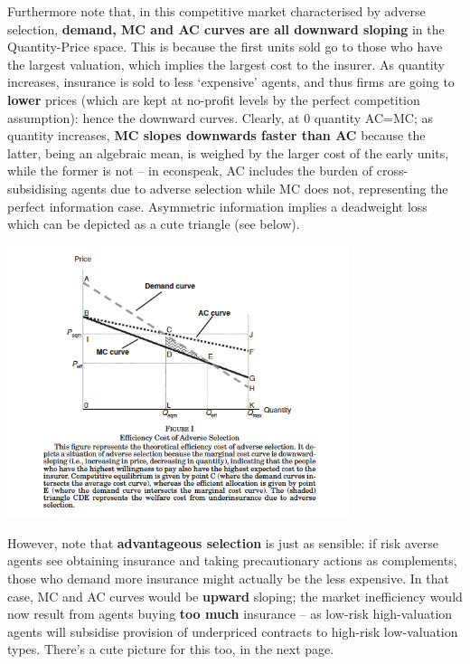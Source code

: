 \documentclass[11pt]{article}
\numberwithin{equation}{section}
\begin{document}
Furthermore note that, in this competitive market characterised by adverse selection, \textbf{demand, MC and AC curves are all downward sloping} in the Quantity-Price space.
This is because the first units sold go to those who have the largest valuation, which implies the largest cost to the insurer.
As quantity increases, insurance is sold to less `expensive' agents, and thus firms are going to \textbf{lower} prices (which are kept at no-profit levels by the perfect competition assumption): hence the downward curves.
Clearly, at 0 quantity AC=MC; as quantity increases, \textbf{MC slopes downwards faster than AC} because the latter, being an algebraic mean, is weighed by the larger cost of the early units, while the former is not -- in econspeak, AC includes the burden of cross-subsidising agents due to adverse selection while MC does not, representing the perfect information case.
Asymmetric information implies a deadweight loss which can be depicted as a cute triangle (see below).

\begin{center}
\includegraphics[width=0.75\textwidth]{p1}
\end{center}

However, note that \textbf{advantageous selection} is just as sensible: if risk averse agents see obtaining insurance and taking precautionary actions as complements, those who demand more insurance might actually be the less expensive.
In that case, MC and AC curves would be \textbf{upward} sloping; the market inefficiency would now result from agents buying \textbf{too much} insurance -- as low-risk high-valuation agents will subsidise provision of underpriced contracts to high-risk low-valuation types.
There's a cute picture for this too, in the next page. \\
\end{document}
